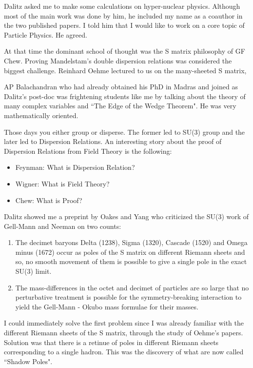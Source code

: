 Dalitz asked me to make some calculations on hyper-nuclear physics. 
Although most of the main work was done by him, he included my name as a 
coauthor in the two published papers. I told him that I would like to 
work on a core topic of Particle Physics. He agreed.

At that time the dominant school of thought was the S matrix philosophy 
of GF Chew. Proving Mandelstam's double dispersion relations was 
considered the biggest challenge. Reinhard Oehme lectured to us on the 
many-sheeted S matrix,

AP Balachandran who had already obtained his PhD in Madras and joined as 
Dalitz's post-doc was frightening students like me by talking about the 
theory of many complex variables and ``The Edge of the Wedge Theorem". He 
was very mathematically oriented.

Those days you either group or disperse. The former led to SU(3) group 
and the later led to Dispersion Relations. An interesting story about 
the proof of Dispersion Relations from Field Theory is the following:

\begin{itemize}

\item Feynman: What is Dispersion Relation? 
\item Wigner: What is Field Theory? 
\item Chew: What is Proof?

\end{itemize}
Dalitz showed me a preprint by Oakes and Yang who criticized the SU(3) 
work of Gell-Mann and Neeman on two counts:

\begin{enumerate}

\item The decimet baryons Delta (1238), Sigma (1320), Cascade (1520) and 
Omega minus (1672) occur as poles of the S matrix on different Riemann 
sheets and so, no smooth movement of them is possible to give a single 
pole in the exact SU(3) limit.

\item The mass-differences in the octet and decimet of particles are so 
large that no perturbative treatment is possible for the 
symmetry-breaking interaction to yield the Gell-Mann - Okubo mass 
formulae for their masses.
\end{enumerate}

I could immediately solve the first problem since I was already familiar 
with the different Riemann sheets of the S matrix, through the study of 
Oehme's papers. Solution was that there is a retinue of poles in 
different Riemann sheets corresponding to a single hadron. This was the 
discovery of what are now called ``Shadow Poles".

